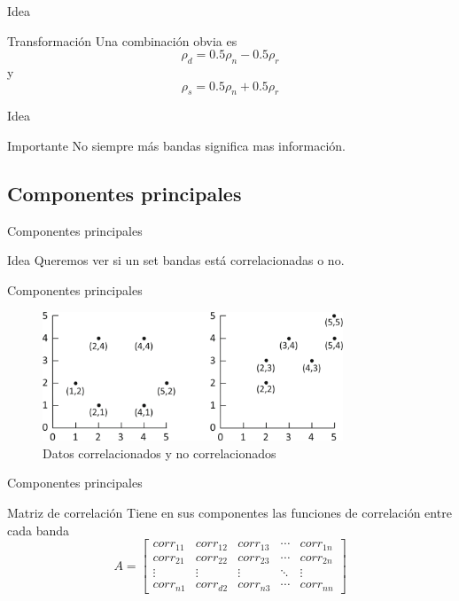 \documentclass[]{beamer}
\begin{document}
\begin{frame}{Idea}
  \begin{alertblock}{Transformación}
    Una combinación obvia es $$ \rho_d = 0.5\rho_n-0.5\rho_r$$
    y
    $$ \rho_s = 0.5\rho_n+0.5\rho_r $$
  \end{alertblock}
\end{frame}


\begin{frame}{Idea}
  \begin{alertblock}{Importante}
    No siempre más bandas significa mas información.
  \end{alertblock}
\end{frame}

\subsection{Componentes principales}
\begin{frame}{Componentes principales}
  \begin{block}{Idea}
    Queremos ver si un set bandas está correlacionadas o no.
  \end{block}
\end{frame}

\begin{frame}{Componentes principales}
  \begin{figure}
  \centering
  \includegraphics[width=0.8\textwidth]{imagenes/corr.png}
  \caption{Datos correlacionados y no correlacionados}
  \end{figure}
\end{frame}

\begin{frame}{Componentes principales}
  \begin{block}{Matriz de correlación}
    Tiene en sus componentes las funciones de correlación entre cada banda\pause
    \[
    A = \begin{bmatrix}
        corr_{11}       & corr_{12} & corr_{13} & \cdots & corr_{1n} \\
        corr_{21}       & corr_{22} & corr_{23} & \cdots & corr_{2n} \\
        \vdots          & \vdots    & \vdots    & \ddots & \vdots \\
        corr_{n1}       & corr_{d2} & corr_{n3} & \cdots & corr_{nn}
    \end{bmatrix} \]
  \end{block}
\end{frame}
\end{document}
